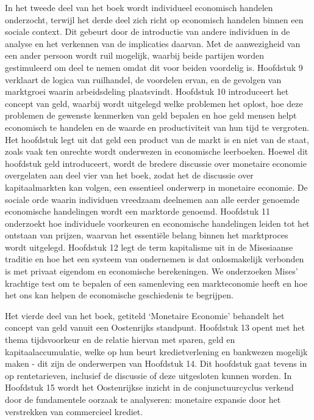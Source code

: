 In het tweede deel van het boek wordt individueel economisch handelen onderzocht, terwijl het derde deel zich richt op economisch handelen binnen een sociale context. Dit gebeurt door de introductie van andere individuen in de analyse en het verkennen van de implicaties daarvan. Met de aanwezigheid van een ander persoon wordt ruil mogelijk, waarbij beide partijen worden gestimuleerd om deel te nemen omdat dit voor beiden voordelig is. Hoofdstuk 9 verklaart de logica van ruilhandel, de voordelen ervan, en de gevolgen van marktgroei waarin arbeidsdeling plaatsvindt. Hoofdstuk 10 introduceert het concept van geld, waarbij wordt uitgelegd welke problemen het oplost, hoe deze problemen de gewenste kenmerken van geld bepalen en hoe geld mensen helpt economisch te handelen en de waarde en productiviteit van hun tijd te vergroten. Het hoofdstuk legt uit dat geld een product van de markt is en niet van de staat, zoals vaak ten onrechte wordt onderwezen in economische leerboeken. Hoewel dit hoofdstuk geld introduceert, wordt de bredere discussie over monetaire economie overgelaten aan deel vier van het boek, zodat het de discussie over kapitaalmarkten kan volgen, een essentieel onderwerp in monetaire economie.
De sociale orde waarin individuen vreedzaam deelnemen aan alle eerder genoemde economische handelingen wordt een marktorde genoemd. Hoofdstuk 11 onderzoekt hoe individuele voorkeuren en economische handelingen leiden tot het ontstaan van prijzen, waarvan het essentiële belang binnen het marktproces wordt uitgelegd. Hoofdstuk 12 legt de term kapitalisme uit in de Misesiaanse traditie en hoe het een systeem van ondernemen is dat onlosmakelijk verbonden is met privaat eigendom en economische berekeningen. We onderzoeken Mises' krachtige test om te bepalen of een samenleving een markteconomie heeft en hoe het ons kan helpen de economische geschiedenis te begrijpen.

Het vierde deel van het boek, getiteld `Monetaire Economie' behandelt het concept van geld vanuit een Oostenrijks standpunt. Hoofdstuk 13 opent met het thema tijdsvoorkeur en de relatie hiervan met sparen, geld en kapitaalaccumulatie, welke op hun beurt kredietverlening en bankwezen mogelijk maken - dit zijn de onderwerpen van Hoofdstuk 14. Dit hoofdstuk gaat tevens in op rentetarieven, inclusief de discussie of deze uitgesloten kunnen worden. In Hoofdstuk 15 wordt het Oostenrijkse inzicht in de conjunctuurcyclus verkend door de fundamentele oorzaak te analyseren: monetaire expansie door het verstrekken van commercieel krediet.

